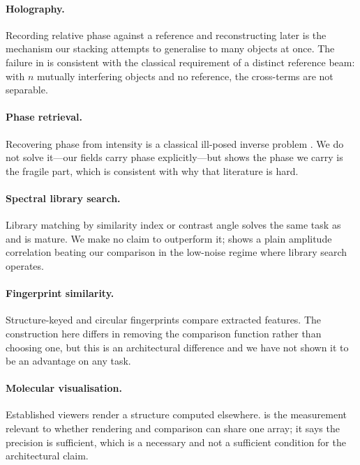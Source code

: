 \documentclass[11pt,twocolumn,a4paper]{article}
\theoremstyle{upthm}
\theoremstyle{definition}
\theoremstyle{remark}
\begin{document}
\paragraph{Holography.} Recording relative phase against a reference and
reconstructing later \citep{gabor1948,goodman2005} is the mechanism our
stacking attempts to generalise to many objects at once. The failure in
 is consistent with the classical requirement of a
distinct reference beam: with $n$ mutually interfering objects and no
reference, the cross-terms are not separable.

\paragraph{Phase retrieval.} Recovering phase from intensity is a
classical ill-posed inverse problem \citep{fienup1982,hadamard1902,
engl1996}. We do not solve it---our fields carry phase explicitly---but
 shows the phase we carry is the fragile part, which is
consistent with why that literature is hard.

\paragraph{Spectral library search.} Library matching by similarity index
or contrast angle \citep{stein1994,wan2002,koo2011} solves the same task
as  and is mature. We make no claim to outperform it;
 shows a plain amplitude correlation beating our
comparison in the low-noise regime where library search operates.

\paragraph{Fingerprint similarity.} Structure-keyed and circular
fingerprints \citep{rogers2010,willett1998,riniker2013} compare extracted
features. The construction here differs in removing the comparison
function rather than choosing one, but this is an architectural
difference and we have not shown it to be an advantage on any task.

\paragraph{Molecular visualisation.} Established viewers
\citep{humphrey1996,pettersen2004,rego2015} render a structure computed
elsewhere.  is the measurement relevant to whether
rendering and comparison can share one array; it says the precision is
sufficient, which is a necessary and not a sufficient condition for the
architectural claim.
\end{document}
